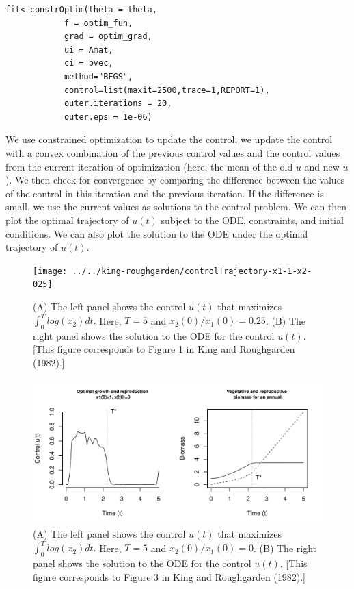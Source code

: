 \documentclass[12pt, oneside]{article}   	%
\begin{document}
\begin{lstlisting}
fit<-constrOptim(theta = theta, 
            f = optim_fun, 
            grad = optim_grad,
            ui = Amat,
            ci = bvec,
            method="BFGS",
            control=list(maxit=2500,trace=1,REPORT=1),
            outer.iterations = 20,
            outer.eps = 1e-06)
\end{lstlisting}

\noindent We use constrained optimization to update the control; we update the control with a convex combination of the previous control values and the control values from the current iteration of optimization (here, the mean of the old $u$ and new $u$). We then check for convergence by comparing the difference between the values of the control in this iteration and the previous iteration. If the difference is small, we use the current values as solutions to the control problem. We can then plot the optimal trajectory of $u(t)$ subject to the ODE, constraints, and initial conditions. We can also plot the solution to the ODE under the optimal trajectory of $u(t)$.

\clearpage

 \begin{figure}[h]
   \centering
       \texttt{[image: ../../king-roughgarden/controlTrajectory-x1-1-x2-025]}  
    \caption{ (A) The left panel shows the control $u(t)$ that maximizes $\int_{0}^{T} log(x_2) dt.$ Here, $T=5$ and $x_2(0)/x_1(0) = 0.25$. (B) The right panel shows the solution to the ODE for the control $u(t)$. [This figure corresponds to Figure 1 in King and Roughgarden (1982).] }
 \label{fig:kingRoughgardenFigure1}
\end{figure}

 \begin{figure}[h]
   \centering
       \includegraphics[page=1,width=.9\textwidth]{../../king-roughgarden/controlTrajectory-x1-1-x2-0}  
    \caption{ (A) The left panel shows the control $u(t)$ that maximizes $ \int_{0}^{T} log(x_2) dt. $ Here, $ T=5$ and $x_2(0)/x_1(0) = 0$. (B) The right panel shows the solution to the ODE for the control $u(t)$. [This figure corresponds to Figure 3 in King and Roughgarden (1982).] }
 \label{fig:kingRoughgardenFigure3}
\end{figure}
\end{document}
